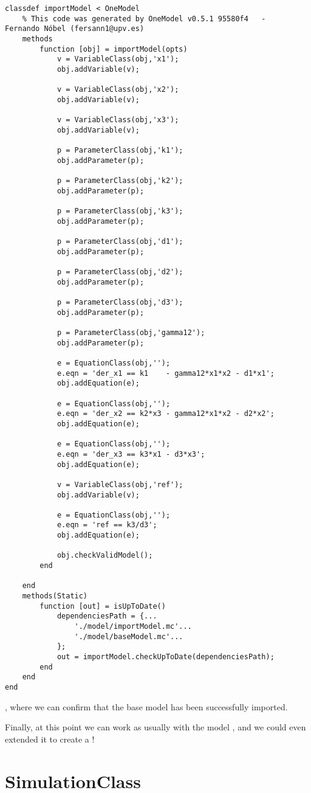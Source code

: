 \documentclass[11pt]{article}
\begin{document}
\begin{lstlisting}
classdef importModel < OneModel
	% This code was generated by OneModel v0.5.1 95580f4   -   Fernando Nóbel (fersann1@upv.es)
	methods
		function [obj] = importModel(opts)
			v = VariableClass(obj,'x1');
			obj.addVariable(v);

			v = VariableClass(obj,'x2');
			obj.addVariable(v);

			v = VariableClass(obj,'x3');
			obj.addVariable(v);

			p = ParameterClass(obj,'k1');
			obj.addParameter(p);

			p = ParameterClass(obj,'k2');
			obj.addParameter(p);

			p = ParameterClass(obj,'k3');
			obj.addParameter(p);

			p = ParameterClass(obj,'d1');
			obj.addParameter(p);

			p = ParameterClass(obj,'d2');
			obj.addParameter(p);

			p = ParameterClass(obj,'d3');
			obj.addParameter(p);

			p = ParameterClass(obj,'gamma12');
			obj.addParameter(p);

			e = EquationClass(obj,'');
			e.eqn = 'der_x1 == k1    - gamma12*x1*x2 - d1*x1';
			obj.addEquation(e);

			e = EquationClass(obj,'');
			e.eqn = 'der_x2 == k2*x3 - gamma12*x1*x2 - d2*x2';
			obj.addEquation(e);

			e = EquationClass(obj,'');
			e.eqn = 'der_x3 == k3*x1 - d3*x3';
			obj.addEquation(e);

			v = VariableClass(obj,'ref');
			obj.addVariable(v);

			e = EquationClass(obj,'');
			e.eqn = 'ref == k3/d3';
			obj.addEquation(e);

			obj.checkValidModel();
		end

	end
	methods(Static)
		function [out] = isUpToDate()
			dependenciesPath = {...
				'./model/importModel.mc'...
				'./model/baseModel.mc'...
			};
			out = importModel.checkUpToDate(dependenciesPath);
		end
	end
end
\end{lstlisting}

, where we can confirm that the base model has been successfully imported.

Finally, at this point we can work as usually with the model , and we could even extended it to create a !

\section{SimulationClass}
\end{document}

